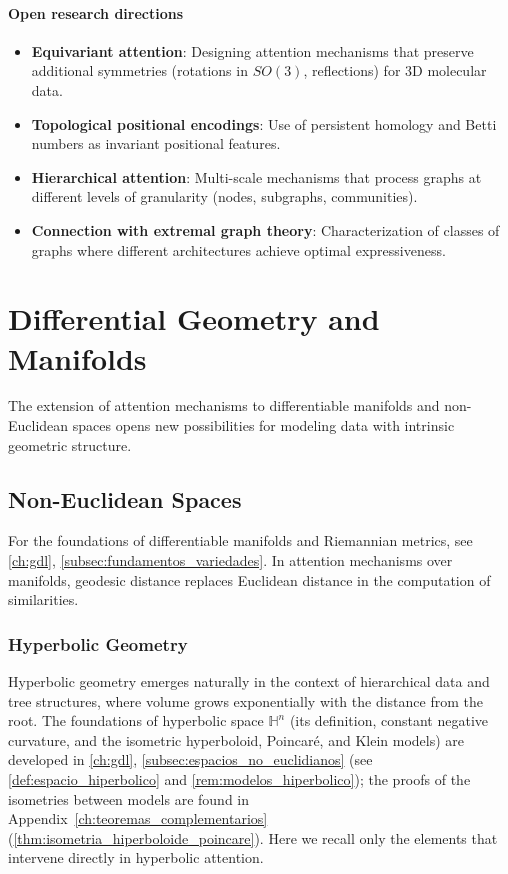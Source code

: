 \paragraph{Open research directions}

\begin{itemize}
    \item \textbf{Equivariant attention}: Designing attention mechanisms that preserve additional symmetries (rotations in $SO(3)$, reflections) for 3D molecular data.

    \item \textbf{Topological positional encodings}: Use of persistent homology and Betti numbers as invariant positional features.

    \item \textbf{Hierarchical attention}: Multi-scale mechanisms that process graphs at different levels of granularity (nodes, subgraphs, communities).

    \item \textbf{Connection with extremal graph theory}: Characterization of classes of graphs where different architectures achieve optimal expressiveness.
\end{itemize}

\section{Differential Geometry and Manifolds}\label{sec:differential_geometry_attention}

The extension of attention mechanisms to differentiable manifolds and non-Euclidean spaces opens new possibilities for modeling data with intrinsic geometric structure.

\subsection{Non-Euclidean Spaces}

For the foundations of differentiable manifolds and Riemannian metrics, see \autoref{ch:gdl}, \autoref{subsec:fundamentos_variedades}. In attention mechanisms over manifolds, geodesic distance replaces Euclidean distance in the computation of similarities.

\subsubsection{Hyperbolic Geometry}

Hyperbolic geometry emerges naturally in the context of hierarchical data and tree structures, where volume grows exponentially with the distance from the root. The foundations of hyperbolic space $\mathbb{H}^n$ (its definition, constant negative curvature, and the isometric hyperboloid, Poincaré, and Klein models) are developed in \autoref{ch:gdl}, \autoref{subsec:espacios_no_euclidianos} (see \autoref{def:espacio_hiperbolico} and \autoref{rem:modelos_hiperbolico}); the proofs of the isometries between models are found in Appendix~\ref{ch:teoremas_complementarios} (\autoref{thm:isometria_hiperboloide_poincare}). Here we recall only the elements that intervene directly in hyperbolic attention.


